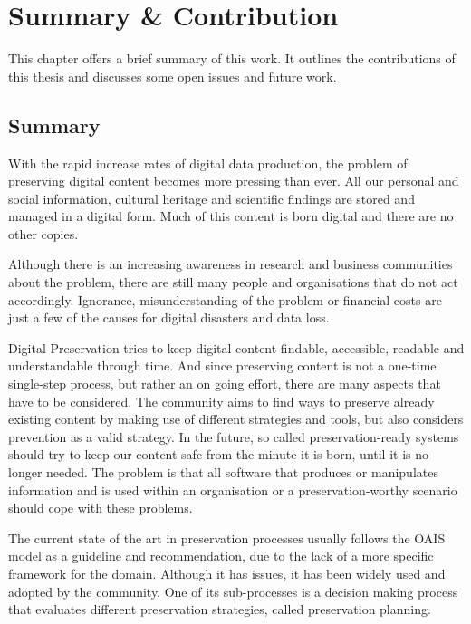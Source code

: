 \section{Summary \& Contribution}
This chapter offers a brief summary of this work. It outlines the contributions of this thesis and discusses some open issues and future work.

\subsection{Summary}
With the rapid increase rates of digital data production, the problem of preserving digital content becomes more pressing than ever.
All our personal and social information, cultural heritage and scientific findings are stored and managed in a digital form.
Much of this content is born digital and there are no other copies.

Although there is an increasing awareness in research and business communities about the problem, there are still many people and organisations that do not act accordingly.
Ignorance, misunderstanding of the problem or financial costs are just a few of the causes for digital disasters and data loss.

Digital Preservation tries to keep digital content findable, accessible, readable and understandable through time.
And since preserving content is not a one-time single-step process, but rather an on going effort, there are many aspects that have to be considered.
The community aims to find ways to preserve already existing content by making use of different strategies and tools, but also considers prevention as a valid strategy.
In the future, so called preservation-ready systems should try to keep our content safe from the minute it is born, until it is no longer needed. The problem is that all software that produces or manipulates information and is used within an organisation or a preservation-worthy scenario should cope with these problems.

The current state of the art in preservation processes usually follows the OAIS model as a guideline and recommendation, due to the lack of a more specific framework for the domain.
Although it has issues, it has been widely used and adopted by the community.
One of its sub-processes is a decision making process that evaluates different preservation strategies, called preservation planning.

